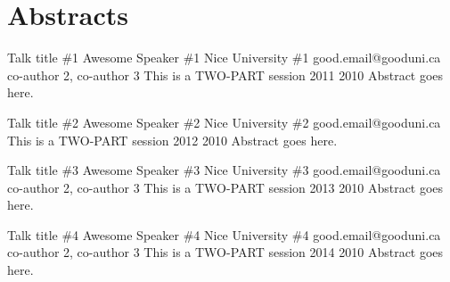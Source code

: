 \documentclass[12pt,a4paper,figuresright]{book}
\begin{document}
 \fi
\clearpage

\chapter{Abstracts}




\iffalse
\begin{talk}
 {Talk title \#1}%
 {Awesome Speaker \#1}%
 {Nice University \#1}%
 {good.email@gooduni.ca}%
 {co-author 2, co-author 3}%
 {This is a TWO-PART session}%
 {}%
 {2011}%
 {2010}%
Abstract goes here.
\end{talk}

\begin{talk}
	{Talk title \#2}%
	{Awesome Speaker \#2}%
	{Nice University \#2}%
	{good.email@gooduni.ca}%
	{}%
	{This is a TWO-PART session}%
	{}%
	{2012}%
	{2010}%
	Abstract goes here.
\end{talk}

\begin{talk}
	{Talk title \#3}%
	{Awesome Speaker \#3}%
	{Nice University \#3}%
	{good.email@gooduni.ca}%
	{co-author 2, co-author 3}%
	{This is a TWO-PART session}%
	{}%
	{2013}%
	{2010}%
	Abstract goes here.
\end{talk}

\begin{talk}
	{Talk title \#4}%
	{Awesome Speaker \#4}%
	{Nice University \#4}%
	{good.email@gooduni.ca}%
	{co-author 2, co-author 3}%
	{This is a TWO-PART session}%
	{}%
	{2014}%
	{2010}%
	Abstract goes here.
\end{talk}
\end{document}
